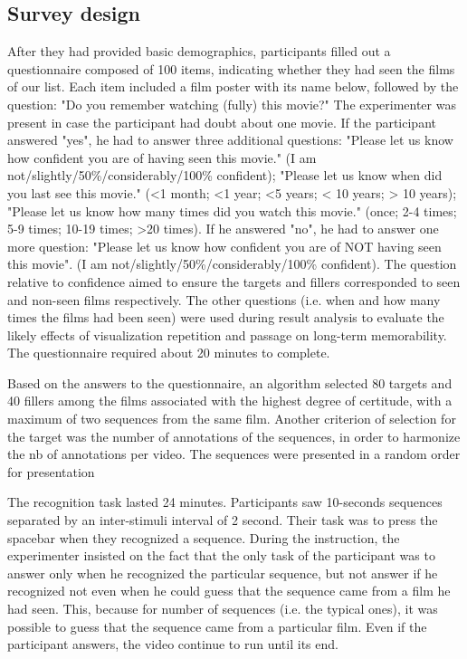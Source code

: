 \documentclass[sigconf]{acmart}
\begin{document}
\subsection{Survey design}
After they had provided basic demographics, participants filled out a questionnaire composed of 100 items, indicating whether they had seen the films of our list.
Each item included a film poster with its name below, followed by the question: "Do you remember watching (fully) this movie?" The experimenter was present in case the participant had doubt about one movie.
If the participant answered "yes", he had to answer three additional questions: "Please let us know how confident you are of having seen this movie." (I am not/slightly/50\%/considerably/100\% confident); "Please let us know when did you last see this movie." (<1 month; <1 year; <5 years; < 10 years; > 10 years); "Please let us know how many times did you watch this movie." (once; 2-4 times; 5-9 times; 10-19 times; >20 times).
If he answered "no", he had to answer one more question: "Please let us know how confident you are of NOT having seen this movie". (I am not/slightly/50\%/considerably/100\% confident).
The question relative to confidence aimed to ensure the targets and fillers corresponded to seen and non-seen films respectively.
The other questions (i.e. when and how many times the films had been seen) were used during result analysis to evaluate the likely effects of visualization repetition and passage on long-term memorability.
The questionnaire required about 20 minutes to complete.

Based on the answers to the questionnaire, an algorithm selected 80 targets and 40 fillers among the films associated with the highest degree of certitude, with a maximum of two sequences from the same film.
Another criterion of selection for the target was the number of annotations of the sequences, in order to harmonize the nb of annotations per video.
The sequences were presented in a random order for presentation

The recognition task lasted 24 minutes. Participants saw 10-seconds sequences separated by an inter-stimuli interval of 2 second. Their task was to press the spacebar when they recognized a sequence.
During the instruction, the experimenter insisted on the fact that the only task of the participant was to answer only when he recognized the particular sequence, but not answer if he recognized not even when he could guess that the sequence came from a film he had seen. This, because for number of sequences (i.e. the typical ones), it was possible to guess that the sequence came from a particular film.
Even if the participant answers, the video continue to run until its end.
\end{document}
